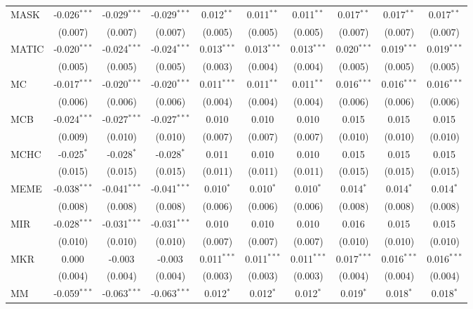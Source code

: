\begin{table}[!htbp]
\begin{tabular}{@{\extracolsep{5pt}}lccccccccc}
 MASK & -0.026$^{***}$ & -0.029$^{***}$ & -0.029$^{***}$ & 0.012$^{**}$ & 0.011$^{**}$ & 0.011$^{**}$ & 0.017$^{**}$ & 0.017$^{**}$ & 0.017$^{**}$ \\
  & (0.007) & (0.007) & (0.007) & (0.005) & (0.005) & (0.005) & (0.007) & (0.007) & (0.007) \\
 MATIC & -0.020$^{***}$ & -0.024$^{***}$ & -0.024$^{***}$ & 0.013$^{***}$ & 0.013$^{***}$ & 0.013$^{***}$ & 0.020$^{***}$ & 0.019$^{***}$ & 0.019$^{***}$ \\
  & (0.005) & (0.005) & (0.005) & (0.003) & (0.004) & (0.004) & (0.005) & (0.005) & (0.005) \\
 MC & -0.017$^{***}$ & -0.020$^{***}$ & -0.020$^{***}$ & 0.011$^{***}$ & 0.011$^{**}$ & 0.011$^{**}$ & 0.016$^{***}$ & 0.016$^{***}$ & 0.016$^{***}$ \\
  & (0.006) & (0.006) & (0.006) & (0.004) & (0.004) & (0.004) & (0.006) & (0.006) & (0.006) \\
 MCB & -0.024$^{***}$ & -0.027$^{***}$ & -0.027$^{***}$ & 0.010$^{}$ & 0.010$^{}$ & 0.010$^{}$ & 0.015$^{}$ & 0.015$^{}$ & 0.015$^{}$ \\
  & (0.009) & (0.010) & (0.010) & (0.007) & (0.007) & (0.007) & (0.010) & (0.010) & (0.010) \\
 MCHC & -0.025$^{*}$ & -0.028$^{*}$ & -0.028$^{*}$ & 0.011$^{}$ & 0.010$^{}$ & 0.010$^{}$ & 0.015$^{}$ & 0.015$^{}$ & 0.015$^{}$ \\
  & (0.015) & (0.015) & (0.015) & (0.011) & (0.011) & (0.011) & (0.015) & (0.015) & (0.015) \\
 MEME & -0.038$^{***}$ & -0.041$^{***}$ & -0.041$^{***}$ & 0.010$^{*}$ & 0.010$^{*}$ & 0.010$^{*}$ & 0.014$^{*}$ & 0.014$^{*}$ & 0.014$^{*}$ \\
  & (0.008) & (0.008) & (0.008) & (0.006) & (0.006) & (0.006) & (0.008) & (0.008) & (0.008) \\
 MIR & -0.028$^{***}$ & -0.031$^{***}$ & -0.031$^{***}$ & 0.010$^{}$ & 0.010$^{}$ & 0.010$^{}$ & 0.016$^{}$ & 0.015$^{}$ & 0.015$^{}$ \\
  & (0.010) & (0.010) & (0.010) & (0.007) & (0.007) & (0.007) & (0.010) & (0.010) & (0.010) \\
 MKR & 0.000$^{}$ & -0.003$^{}$ & -0.003$^{}$ & 0.011$^{***}$ & 0.011$^{***}$ & 0.011$^{***}$ & 0.017$^{***}$ & 0.016$^{***}$ & 0.016$^{***}$ \\
  & (0.004) & (0.004) & (0.004) & (0.003) & (0.003) & (0.003) & (0.004) & (0.004) & (0.004) \\
 MM & -0.059$^{***}$ & -0.063$^{***}$ & -0.063$^{***}$ & 0.012$^{*}$ & 0.012$^{*}$ & 0.012$^{*}$ & 0.019$^{*}$ & 0.018$^{*}$ & 0.018$^{*}$ \\

\end{tabular}
\end{table}
